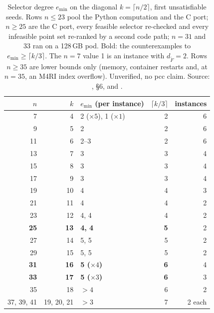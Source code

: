 \begin{table}[t]
\centering\small
\begin{tabular}{@{}rrlrr@{}}
\toprule
$n$ & $k$ & $e_{\min}$ (per instance) & $\lceil k/3\rceil$ & instances \\
\midrule
7 & 4 & 2 ($\times5$), 1 ($\times1$) & 2 & 6 \\
9 & 5 & 2 & 2 & 6 \\
11 & 6 & 2--3 & 2 & 6 \\
13 & 7 & 3 & 3 & 4 \\
15 & 8 & 3 & 3 & 4 \\
17 & 9 & 3 & 3 & 4 \\
19 & 10 & 4 & 4 & 3 \\
21 & 11 & 4 & 4 & 2 \\
23 & 12 & 4, 4 & 4 & 2 \\
\textbf{25} & \textbf{13} & \textbf{4, 4} & \textbf{5} & 2 \\
27 & 14 & 5, 5 & 5 & 2 \\
29 & 15 & 5, 5 & 5 & 2 \\
\textbf{31} & \textbf{16} & \textbf{5 ($\times4$)} & \textbf{6} & 4 \\
\textbf{33} & \textbf{17} & \textbf{5 ($\times3$)} & \textbf{6} & 3 \\
35 & 18 & $>4$ & 6 & 2 \\
37, 39, 41 & 19, 20, 21 & $>3$ & 7 & 2 each \\
\bottomrule
\end{tabular}
\caption[]{Selector degree $e_{\min}$ on the diagonal $k=\lceil n/2\rceil$,
first unsatisfiable seeds. Rows $n\le23$ pool the Python computation and
the C port; $n\ge25$ are the C port, every feasible selector re-checked and
every infeasible point set re-ranked by a second code path; $n=31$ and
33 ran on a 128\,GB pod. Bold: the
counterexamples to $e_{\min}\ge\lceil k/3\rceil$. The $n=7$ value 1 is an
instance with $d_{\tilde F}=2$. Rows $n\ge35$ are lower bounds only (memory,
container restarts and, at $n=35$, an M4RI index overflow). Unverified, no
pcc claim. Source: , \S6, and
.}
\label{tab:fd-selector}
\end{table}

